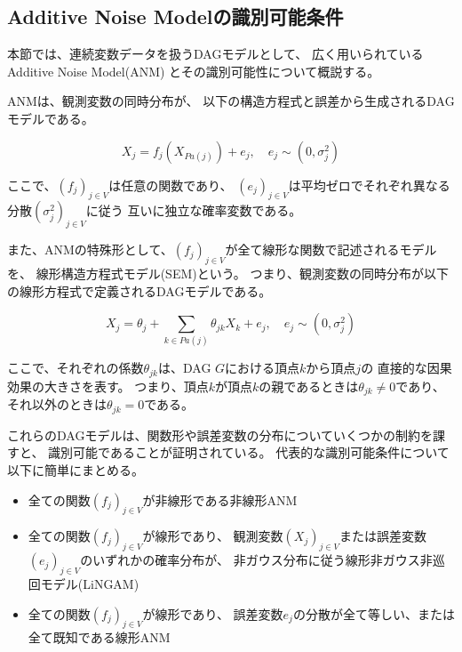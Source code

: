 
\subsection{Additive Noise Modelの識別可能条件}

本節では、連続変数データを扱うDAGモデルとして、
広く用いられているAdditive Noise Model(ANM)
\cite{Shimizu2006-yu}
\cite{Hoyer2008-oo}
\cite{Peters2013-eb}
\cite{Peters2014-ro}
\cite{Park2020-ey}
とその識別可能性について概説する。

ANMは、観測変数の同時分布が、
以下の構造方程式と誤差から生成されるDAGモデルである。

\begin{equation}
  X_j = f_j(X_{Pa(j)}) + e_j , \quad e_j \sim (0, \sigma_j^2)
  \label{def:ANM}
\end{equation}

ここで、$(f_j)_{j\in V}$は任意の関数であり、
$(e_j)_{j\in V}$は平均ゼロでそれぞれ異なる分散$(\sigma_j^2)_{j\in V}$に従う
互いに独立な確率変数である。

また、ANMの特殊形として、$(f_j)_{j\in V}$が全て線形な関数で記述されるモデルを、
線形構造方程式モデル(SEM)という。
つまり、観測変数の同時分布が以下の線形方程式で定義されるDAGモデルである。

\begin{equation}
  X_j = \theta_j + \sum_{k \in Pa(j)} \theta_{jk} X_k + e_j, \quad e_j \sim (0, \sigma_j^2)
\end{equation}

ここで、それぞれの係数$\theta_{jk}$は、DAG $G$における頂点$k$から頂点$j$の
直接的な因果効果の大きさを表す。
つまり、頂点$k$が頂点$k$の親であるときは$\theta_{jk} \neq 0$であり、
それ以外のときは$\theta_{jk}=0$である。

これらのDAGモデルは、関数形や誤差変数の分布についていくつかの制約を課すと、
識別可能であることが証明されている。
代表的な識別可能条件について以下に簡単にまとめる。

\begin{itemize}
  \item
  全ての関数$(f_j)_{j \in V}$が非線形である非線形ANM\cite{Hoyer2008-oo}

  \item
  全ての関数$(f_j)_{j \in V}$が線形であり、
  観測変数$(X_j)_{j \in V}$または誤差変数$(e_j)_{j\in V}$のいずれかの確率分布が、
  非ガウス分布に従う線形非ガウス非巡回モデル(LiNGAM)\cite{Shimizu2006-yu}

  \item
  全ての関数$(f_j)_{j \in V}$が線形であり、
  誤差変数$e_j$の分散が全て等しい、または全て既知である線形ANM\cite{Peters2013-eb}
\end{itemize}

